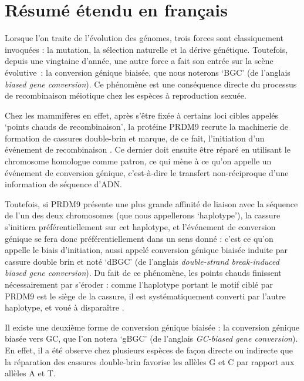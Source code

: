 \section*{Résumé étendu en français}

{

Lorsque l'on traite de l'évolution des génomes, trois forces sont classiquement invoquées : la mutation, la sélection naturelle et la dérive génétique.
%
Toutefois, depuis une vingtaine d'année, une autre force a fait son entrée sur la scène évolutive~: la conversion génique biaisée, que nous noterons ‘BGC’ (de l'anglais \textit{biased gene conversion}).
Ce phénomène est une conséquence directe du processus de recombinaison méiotique chez les espèces à reproduction sexuée.

Chez les mammifères en effet, après s'être fixée à certains loci cibles appelés ‘points chauds de recombinaison’, la protéine PRDM9 recrute la machinerie de formation de cassures double-brin et marque, de ce fait, l'initiation d'un événement de recombinaison \citep{baudat2010prdm9,myers2010drive,parvanov2010prdm9}.
Ce dernier doit ensuite être réparé en utilisant le chromosome homologue comme patron, ce qui mène à ce qu'on appelle un événement de conversion génique, c'est-à-dire le transfert non-réciproque d'une information de séquence d'ADN\@.

Toutefois, si PRDM9 présente une plus grande affinité de liaison avec la séquence de l'un des deux chromosomes (que nous appellerons ‘haplotype’), la cassure s'initiera préférentiellement sur cet haplotype, et l'événement de conversion génique se fera donc préférentiellement dans un sens donné : c'est ce qu'on appelle le biais d'initiation, aussi appelé conversion génique biaisée induite par cassure double brin et noté ‘dBGC’ (de l'anglais \textit{double-strand break-induced biased gene conversion}).
Du fait de ce phénomène, les points chauds finissent nécessairement par s'éroder : comme l'haplotype portant le motif ciblé par PRDM9 est le siège de la cassure, il est systématiquement converti par l'autre haplotype, et voué à dispara\^itre \citep{boulton1997hotspot}.

Il existe une deuxième forme de conversion génique biaisée : la conversion génique biasée vers GC, que l'on notera ‘gBGC’ (de l'anglais \textit{GC-biased gene conversion}).
En effet, il a été observe chez plusieurs espèces 
de façon directe \citep{mancera2008highresolution, si2015widely, williams2015noncrossover, halldorsson2016rate, keith2016high, smeds2016highresolution}
ou indirecte \citep{escobar2011gcbiased,pessia2012evidence,figuet2014biased}
que la réparation des cassures double-brin favorise les allèles G et C par rapport aux allèles A et T\@.\\


}
